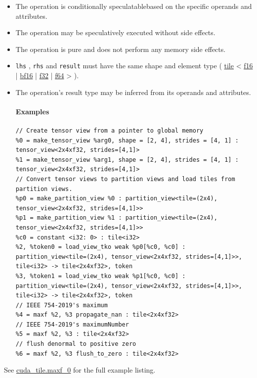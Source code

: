 \documentclass{article}
\begin{document}
\begin{itemize}
\item The operation is conditionally speculatablebased on the specific operands and attributes.
\item The operation may be speculatively executed without side effects.
\item The operation is pure and does not perform any memory side effects.
\item \texttt{lhs} , \texttt{rhs} and \texttt{result} must have the same shape and element type ( \href{https://docs.nvidia.com/cuda/tile-ir/latest/sections/types.html#type-tile}{tile} < \href{https://docs.nvidia.com/cuda/tile-ir/latest/sections/types.html#subsection-element-types}{f16} | \href{https://docs.nvidia.com/cuda/tile-ir/latest/sections/types.html#subsection-element-types}{bf16} | \href{https://docs.nvidia.com/cuda/tile-ir/latest/sections/types.html#subsection-element-types}{f32} | \href{https://docs.nvidia.com/cuda/tile-ir/latest/sections/types.html#subsection-element-types}{f64} > ).
\item The operation's result type may be inferred from its operands and attributes.


\paragraph{Examples}

\begin{lstlisting}
// Create tensor view from a pointer to global memory
%0 = make_tensor_view %arg0, shape = [2, 4], strides = [4, 1] : tensor_view<2x4xf32, strides=[4,1]>
%1 = make_tensor_view %arg1, shape = [2, 4], strides = [4, 1] : tensor_view<2x4xf32, strides=[4,1]>
// Convert tensor views to partition views and load tiles from partition views.
%p0 = make_partition_view %0 : partition_view<tile=(2x4), tensor_view<2x4xf32, strides=[4,1]>>
%p1 = make_partition_view %1 : partition_view<tile=(2x4), tensor_view<2x4xf32, strides=[4,1]>>
%c0 = constant <i32: 0> : tile<i32>
%2, %token0 = load_view_tko weak %p0[%c0, %c0] : partition_view<tile=(2x4), tensor_view<2x4xf32, strides=[4,1]>>, tile<i32> -> tile<2x4xf32>, token
%3, %token1 = load_view_tko weak %p1[%c0, %c0] : partition_view<tile=(2x4), tensor_view<2x4xf32, strides=[4,1]>>, tile<i32> -> tile<2x4xf32>, token
// IEEE 754-2019's maximum
%4 = maxf %2, %3 propagate_nan : tile<2x4xf32>
// IEEE 754-2019's maximumNumber
%5 = maxf %2, %3 : tile<2x4xf32>
// flush denormal to positive zero
%6 = maxf %2, %3 flush_to_zero : tile<2x4xf32>
\end{lstlisting}

\end{itemize}
See \href{https://docs.nvidia.com/cuda/tile-ir/latest/sections/appendix.html#example-cuda-tile-maxf-0}{cuda\_tile.maxf\_0} for the full example listing.
\end{document}
